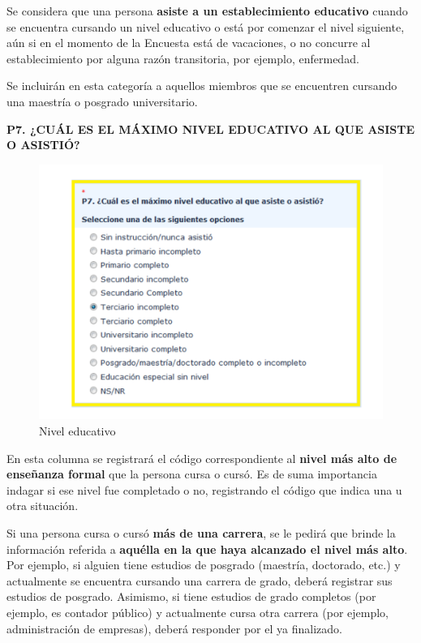 \documentclass[
  openany]{book}
\begin{document}
Se considera que una persona \textbf{asiste a un establecimiento educativo} cuando se encuentra cursando un nivel educativo o está por comenzar el nivel siguiente, aún si en el momento de la Encuesta está de vacaciones, o no concurre al establecimiento por alguna razón transitoria, por ejemplo, enfermedad.

Se incluirán en esta categoría a aquellos miembros que se encuentren cursando una maestría o posgrado universitario.

\textbf{P7. ¿CUÁL ES EL MÁXIMO NIVEL EDUCATIVO AL QUE ASISTE O ASISTIÓ?}

\begin{figure}

{\centering \includegraphics[width=1\linewidth]{imagenes/figura6-54} 

}

\caption{Nivel educativo}\label{fig:niveledu}
\end{figure}

En esta columna se registrará el código correspondiente al \textbf{nivel más alto de enseñanza formal} que la persona cursa o cursó. Es de suma importancia indagar si ese nivel fue completado o no, registrando el código que indica una u otra situación.

Si una persona cursa o cursó \textbf{más de una carrera}, se le pedirá que brinde la información referida a \textbf{aquélla en la que haya alcanzado el nivel más alto}. Por ejemplo, si alguien tiene estudios de posgrado (maestría, doctorado, etc.) y actualmente se encuentra cursando una carrera de grado, deberá registrar sus estudios de posgrado. Asimismo, si tiene estudios de grado completos (por ejemplo, es contador público) y actualmente cursa otra carrera (por ejemplo, administración de empresas), deberá responder por el ya finalizado.
\end{document}
